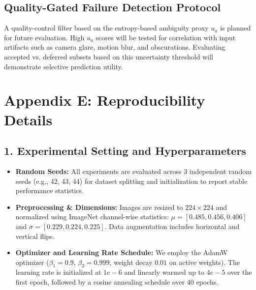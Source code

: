\documentclass[letterpaper]{article} %
\begin{document}
\subsection{Quality-Gated Failure Detection Protocol}
A quality-control filter based on the entropy-based ambiguity proxy $u_a$ is planned for future evaluation. High $u_a$ scores will be tested for correlation with input artifacts such as camera glare, motion blur, and obscurations. Evaluating accepted vs. deferred subsets based on this uncertainty threshold will demonstrate selective prediction utility.

\section{Appendix E: Reproducibility Details}

\subsection*{1. Experimental Setting and Hyperparameters}
\begin{itemize}
    \item \textbf{Random Seeds:} All experiments are evaluated across 3 independent random seeds (e.g., 42, 43, 44) for dataset splitting and initialization to report stable performance statistics.
    \item \textbf{Preprocessing \& Dimensions:} Images are resized to $224 \times 224$ and normalized using ImageNet channel-wise statistics: $\mu = [0.485, 0.456, 0.406]$ and $\sigma = [0.229, 0.224, 0.225]$. Data augmentation includes horizontal and vertical flips.
    \item \textbf{Optimizer and Learning Rate Schedule:} We employ the AdamW optimizer ($\beta_1=0.9$, $\beta_2=0.999$, weight decay $0.01$ on active weights). The learning rate is initialized at $1e-6$ and linearly warmed up to $4e-5$ over the first epoch, followed by a cosine annealing schedule over 40 epochs.
\end{itemize}
\end{document}
